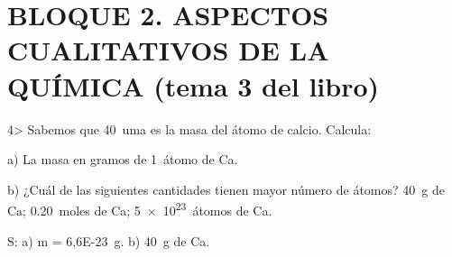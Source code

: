 \documentclass{article}
\begin{document}
\section{BLOQUE 2. ASPECTOS CUALITATIVOS DE LA QUÍMICA (tema 3 del libro)}

4> Sabemos que \SI{40}{uma} es la masa del átomo de calcio. Calcula:

a) La masa en gramos de \SI{1}{átomo} de Ca.

b) ¿Cuál de las siguientes cantidades tienen mayor número de átomos? \SI{40}{g} de Ca; \SI{0,20}{moles} de Ca; \SI{5e23}{átomos} de Ca.

S: a) m = \SI{6,6E-23}{\gram}. b) \SI{40}{\gram} de Ca.

%
%
%
%
%
%
%
%
\end{document}
